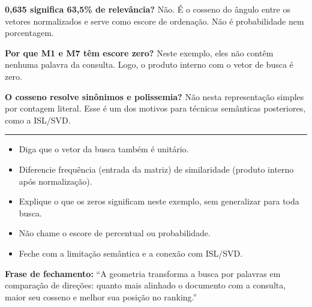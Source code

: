 \documentclass[10pt,a4paper]{article}
\newcommand{\secao}[1]{\vspace{3pt}{\large\color{udescgreen}\textbf{#1}}\par\vspace{1pt}\hrule\vspace{4pt}}
\begin{document}
\textbf{0,635 significa 63,5\% de relevância?} Não. É o cosseno do ângulo entre os vetores normalizados e serve como escore de ordenação. Não é probabilidade nem porcentagem.

\textbf{Por que M1 e M7 têm escore zero?} Neste exemplo, eles não contêm nenhuma palavra da consulta. Logo, o produto interno com o vetor de busca é zero.

\textbf{O cosseno resolve sinônimos e polissemia?} Não nesta representação simples por contagem literal. Esse é um dos motivos para técnicas semânticas posteriores, como a ISL/SVD.

\secao{Não esqueça}
\begin{itemize}
  \item Diga que o vetor da busca também é unitário.
  \item Diferencie frequência (entrada da matriz) de similaridade (produto interno após normalização).
  \item Explique o que os zeros significam neste exemplo, sem generalizar para toda busca.
  \item Não chame o escore de percentual ou probabilidade.
  \item Feche com a limitação semântica e a conexão com ISL/SVD.
\end{itemize}

\vfill
{\small\color{udescgreen}\textbf{Frase de fechamento:} “A geometria transforma a busca por palavras em comparação de direções: quanto mais alinhado o documento com a consulta, maior seu cosseno e melhor sua posição no ranking.”}
\end{document}

